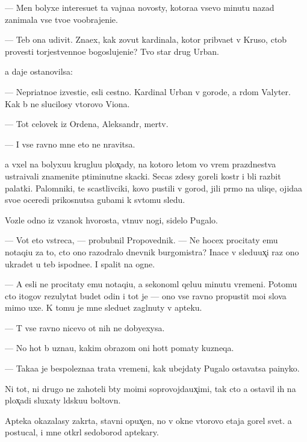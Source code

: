 \documentclass[10pt]{book}
\begin{document}
— Men{\ia} bolyxe interesu{\y}et ta vajna{\y}a novosty, kotora{\y}a vsevo minutu nazad zanimala vse tvo{\y}e voobrajeni{\y}e.

— Teb{\ia} ona udivit. Zna{\y}ex, kak zovut kardinala, kotor{\yi}{\y} prib{\yi}va{\y}et v Kruso, ctob{\yi} provesti torjestvenno{\y}e bogoslujeni{\y}e? Tvo{\y} star{\yi}{\y} drug Urban.

{\Y}a daje ostanovilsa:

— Nepri{\y}atno{\y}e izvesti{\y}e, {\y}esli cestno. Kardinal Urban v gorode, a r{\ia}dom Valyter. Kak b{\yi} ne slucilosy vtorovo Viona.

— Tot celovek iz Ordena, Aleksandr, mertv.

— I vse ravno mne eto ne nravitsa.

{\Y}a v{\yi}xel na bolyxu{\y}u kruglu{\y}u plox̨ady, na kotoro{\y} letom vo vrem{\ia} prazdnestva ustra{\y}ivali znamenit{\yi}{\y}e p{\ia}timinutn{\yi}{\y}e skacki. Se{\y}cas zdesy goreli kostr{\yi} i b{\yi}li razbit{\yi} palatki. Palomniki, te scastlivciki, kovo pustili v gorod, jili pr{\ia}mo na uliqe, ojida{\y}a svo{\y}e{\y} oceredi prikosnutsa gubami k sv{\ia}tomu sledu.

Vozle odno{\y} iz v{\ia}zanok hvorosta, v{\yi}t{\ia}nuv nogi, sidelo Pugalo.

— Vot eto vstreca, — probubnil Propovednik. — Ne hocex procitaty {\y}emu notaqi{\y}u za to, cto ono razodralo dnevnik burgomistra? Inace v sledu{\y}ux̨i{\y} raz ono ukradet u teb{\ia} ispodne{\y}e. I spalit na ogne.

— A {\y}esli ne procitaty {\y}emu notaqi{\y}u, {\y}a sekonoml{\iu} qelu{\y}u minutu vremeni. Potomu cto itogov{\yi}{\y} rezulytat budet odin i tot je — ono vse ravno propustit mo{\y}i slova mimo uxe{\y}. K tomu je mne sledu{\y}et zagl{\ia}nuty v apteku.

— T{\yi} vse ravno nicevo ot nih ne dobyexysa.

— No hot{\ia} b{\yi} uzna{\y}u, kakim obrazom oni hot{\ia}t po{\y}maty kuzneqa.

— Taka{\y}a je bespolezna{\y}a trata vremeni, kak ubejdaty Pugalo ostavatsa pa{\y}inyko{\y}.

Ni tot, ni drugo{\y} ne zahoteli b{\yi}ty mo{\y}imi soprovojda{\y}ux̨imi, tak cto {\y}a ostavil ih na plox̨adi sluxaty l{\iu}dsku{\y}u boltovn{\iu}.

Apteka okazalasy zakr{\yi}ta, stavni opux̨en{\yi}, no v okne vtorovo etaja gorel svet. {\Y}a postucal, i mne otkr{\yi}l sedoborod{\yi}{\y} aptekary.
\end{document}
